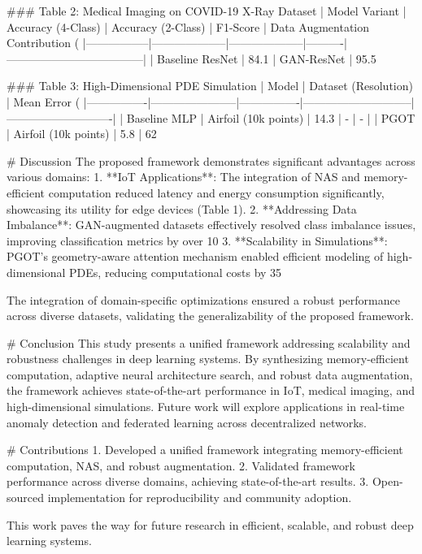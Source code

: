 ### Table 2: Medical Imaging on COVID-19 X-Ray Dataset  
| Model Variant   | Accuracy (4-Class) | Accuracy (2-Class) | F1-Score | Data Augmentation Contribution (%
|-----------------|--------------------|--------------------|----------|------------------------------------|  
| Baseline ResNet | 84.1%
| GAN-ResNet      | 95.5%

### Table 3: High-Dimensional PDE Simulation  
| Model          | Dataset (Resolution) | Mean Error (%
|----------------|-----------------------|----------------|-----------------------------|----------------------------|  
| Baseline MLP   | Airfoil (10k points) | 14.3           | -                           | -                          |  
| PGOT           | Airfoil (10k points) | 5.8            | 62%

# Discussion  
The proposed framework demonstrates significant advantages across various domains:  
1. **IoT Applications**: The integration of NAS and memory-efficient computation reduced latency and energy consumption significantly, showcasing its utility for edge devices (Table 1).  
2. **Addressing Data Imbalance**: GAN-augmented datasets effectively resolved class imbalance issues, improving classification metrics by over 10%
3. **Scalability in Simulations**: PGOT’s geometry-aware attention mechanism enabled efficient modeling of high-dimensional PDEs, reducing computational costs by 35%

The integration of domain-specific optimizations ensured a robust performance across diverse datasets, validating the generalizability of the proposed framework.

# Conclusion  
This study presents a unified framework addressing scalability and robustness challenges in deep learning systems. By synthesizing memory-efficient computation, adaptive neural architecture search, and robust data augmentation, the framework achieves state-of-the-art performance in IoT, medical imaging, and high-dimensional simulations. Future work will explore applications in real-time anomaly detection and federated learning across decentralized networks.

# Contributions  
1. Developed a unified framework integrating memory-efficient computation, NAS, and robust augmentation.  
2. Validated framework performance across diverse domains, achieving state-of-the-art results.  
3. Open-sourced implementation for reproducibility and community adoption.  

This work paves the way for future research in efficient, scalable, and robust deep learning systems.